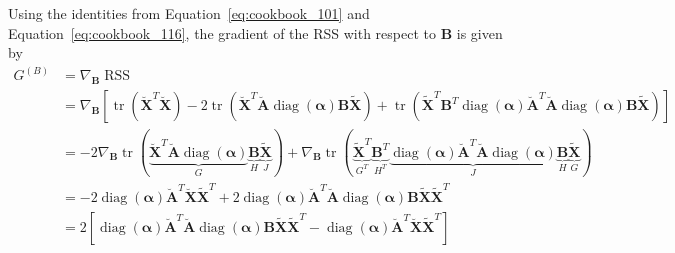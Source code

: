 \documentclass{article}
\begin{document}
Using the identities from Equation~\ref{eq:cookbook_101} and Equation~\ref{eq:cookbook_116}, the gradient of the RSS with respect to $\mathbf{B}$ is given by
\begin{equation}
    \label{eq:relaxed_weighted_objective_grad_B}
    \begin{aligned}
        G^{(B)} &= \nabla_{\mathbf{B}} \operatorname{RSS} \\
        &= \nabla_{\mathbf{B}}
        \left[
            \operatorname{tr}\left( \breve{\mathbf{X}}^T \breve{\mathbf{X}} \right)
            - 2 \operatorname{tr} \left( \breve{\mathbf{X}}^T \breve{\mathbf{A}} \operatorname{diag}(\boldsymbol{\alpha}) \mathbf{B} \tilde{\mathbf{X}} \right)
            + \operatorname{tr} \left( \tilde{\mathbf{X}}^T \mathbf{B}^T \operatorname{diag}(\boldsymbol{\alpha}) \breve{\mathbf{A}}^T \breve{\mathbf{A}} \operatorname{diag}(\boldsymbol{\alpha}) \mathbf{B} \tilde{\mathbf{X}} \right)
        \right] \\
        &=
            - 2 \nabla_{\mathbf{B}} \operatorname{tr}(\underbrace{\breve{\mathbf{X}}^T \breve{\mathbf{A}} \operatorname{diag}(\boldsymbol{\alpha})}_{G} \underbrace{\mathbf{B}}_{H} \underbrace{\tilde{\mathbf{X}}}_{J})
            + \nabla_{\mathbf{B}} \operatorname{tr}(\underbrace{\tilde{\mathbf{X}}^T}_{G^T} \underbrace{\mathbf{B}^T}_{H^T} \underbrace{\operatorname{diag}(\boldsymbol{\alpha}) \breve{\mathbf{A}}^T \breve{\mathbf{A}} \operatorname{diag}(\boldsymbol{\alpha})}_{J} \underbrace{\mathbf{B}}_{H} \underbrace{\tilde{\mathbf{X}}}_{G}) \\
        & =
            -2 \operatorname{diag}(\boldsymbol{\alpha}) \breve{\mathbf{A}}^T \breve{\mathbf{X}} \tilde{\mathbf{X}}^T
            +2 \operatorname{diag}(\boldsymbol{\alpha}) \breve{\mathbf{A}}^T \breve{\mathbf{A}} \operatorname{diag}(\boldsymbol{\alpha}) \mathbf{B} \tilde{\mathbf{X}} \tilde{\mathbf{X}}^T \\
        & = 2
        \left[
            \operatorname{diag}(\boldsymbol{\alpha}) \breve{\mathbf{A}}^T \breve{\mathbf{A}} \operatorname{diag}(\boldsymbol{\alpha}) \mathbf{B} \tilde{\mathbf{X}} \tilde{\mathbf{X}}^T
            - \operatorname{diag}(\boldsymbol{\alpha}) \breve{\mathbf{A}}^T \breve{\mathbf{X}} \tilde{\mathbf{X}}^T
        \right]
    \end{aligned}
\end{equation}
\end{document}
